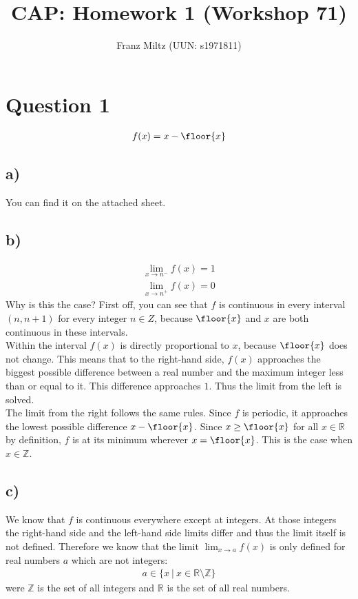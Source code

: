 \documentclass{article}
\title{CAP: Homework 1 (Workshop 71)}
\author{Franz Miltz (UUN: s1971811)}
\begin{document}
\maketitle
\section*{Question 1}
\begin{align*}
  f(x) = x - \floor{x}
\end{align*}
\subsection*{a)}
You can find it on the attached sheet.
\subsection*{b)}
\begin{align*}
  \lim_{x\to n^-}f(x)=1 \\
  \lim_{x\to n^+}f(x)=0
\end{align*}
Why is this the case? First off, you can see that $f$ is continuous in every interval $(n,n+1)$ for every integer $n\in Z$, because $\floor{x}$ and $x$ are both continuous in these intervals.\\
Within the interval $f(x)$ is directly proportional to $x$, because $\floor{x}$ does not change.
This means that to the right-hand side, $f(x)$ approaches the biggest possible difference between a real number and the maximum integer less than or equal to it.
This difference approaches $1$. Thus the limit from the left is solved.\\
The limit from the right follows the same rules.
Since $f$ is periodic, it approaches the lowest possible difference $x-\floor{x}$.
Since $x\geq\floor{x}$ for all $x\in\mathbb{R}$ by definition, $f$ is at its minimum wherever $x=\floor{x}$.
This is the case when $x\in\mathbb{Z}$.
\subsection*{c)}
We know that $f$ is continuous everywhere except at integers. At those integers the right-hand side and the left-hand side limits differ and thus the limit itself is not defined. Therefore we know that the limit $\lim_{x\to a}f(x)$ is only defined for real numbers $a$ which are not integers:
\begin{align*}
  a\in\{x\:|\: x\in\mathbb{R}\setminus\mathbb{Z}\}
\end{align*}
were $\mathbb{Z}$ is the set of all integers and $\mathbb{R}$ is the set of all real numbers.
\end{document}
